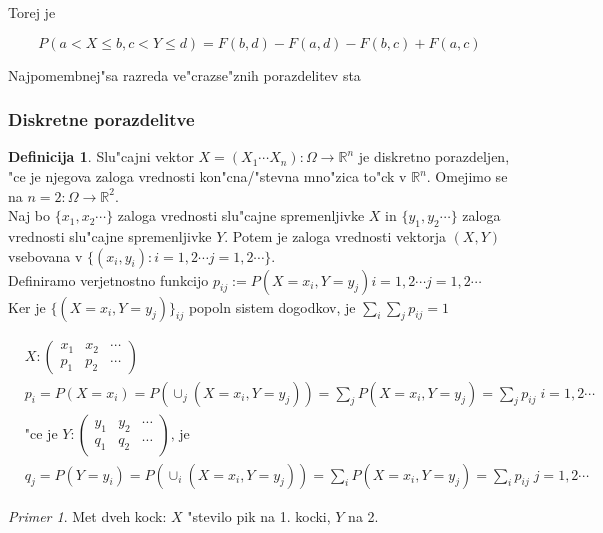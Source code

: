 \documentclass[a4paper,12pt]{article}
\theoremstyle{definition}
\newtheorem{defn}[counter]{Definicija}
\theoremstyle{remark}
\newtheorem*{ex}{Primer}
\newcommand{\R}{\mathbb{R}}
\begin{document}
Torej je

\begin{equation*}
    P(a < X \leq b, c < Y \leq d) = F(b,d) - F(a,d) - F(b,c) + F(a,c)
\end{equation*}

Najpomembnej"sa razreda ve"crazse"znih porazdelitev sta

\subsubsection{Diskretne porazdelitve}

\begin{defn}
    Slu"cajni vektor $X = (X_1 \cdots X_n): \Omega \to \R^n$ je diskretno porazdeljen, "ce je njegova zaloga vrednosti
    kon"cna/"stevna mno"zica to"ck v $\R^n$. Omejimo se na $n=2: \Omega \to \R^2$. \\
    Naj bo $\{x_1, x_2 \cdots\}$ zaloga vrednosti slu"cajne spremenljivke $X$ in $\{y_1, y_2 \cdots\}$ zaloga
    vrednosti slu"cajne spremenljivke $Y$. Potem je zaloga vrednosti vektorja $(X,Y)$ vsebovana v
    $\{(x_i, y_i): i = 1,2 \cdots j = 1,2 \cdots \}$. \\
    Definiramo verjetnostno funkcijo $p_{ij} := P(X = x_i, Y = y_j) i = 1,2 \cdots j = 1,2 \cdots$ \\
    Ker je $\{(X = x_i, Y = y_j)\}_{ij}$ popoln sistem dogodkov, je $\sum_i \sum_j p_{ij} = 1$
\end{defn}

\begin{align*}
    &X: \begin{pmatrix}
            x_1 & x_2 & \cdots \\
            p_1 & p_2 & \cdots
        \end{pmatrix} \\
    &p_i = P(X = x_i) = P(\cup_j (X = x_i, Y = y_j)) = \sum_j P(X = x_i, Y = y_j) = \sum_j p_{ij} \; i = 1,2 \cdots \\
    &\text{"ce je } Y: \begin{pmatrix}
            y_1 & y_2 & \cdots \\
            q_1 & q_2 & \cdots
        \end{pmatrix} \text{, je } \\
    &q_j = P(Y = y_i) = P(\cup_i (X = x_i, Y = y_j)) = \sum_i P(X = x_i, Y = y_j) = \sum_i p_{ij} \; j = 1,2 \cdots
\end{align*}

\begin{ex}
    Met dveh kock: $X$ "stevilo pik na 1. kocki, $Y$ na 2.
\end{ex}
\end{document}
